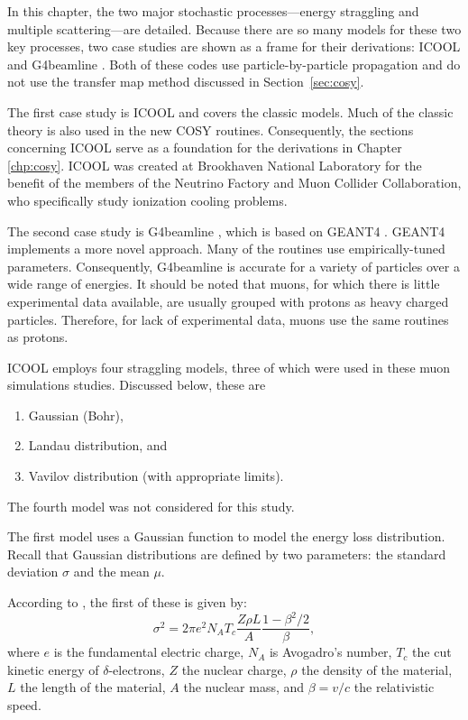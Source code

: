 In this chapter, the two major stochastic processes---energy straggling and multiple scattering---are detailed. Because there are so many models for these two key processes, two case studies are shown as a frame for their derivations: ICOOL \cite{icool} and G4beamline \cite{g4bl}. Both of these codes use particle-by-particle propagation and do not use the transfer map method discussed in Section~\ref{sec:cosy}.

The first case study is ICOOL \cite{icool} and covers the classic models. Much of the classic theory is also used in the new COSY routines. Consequently, the sections concerning ICOOL serve as a foundation for the derivations in Chapter \ref{chp:cosy}. ICOOL was created at Brookhaven National Laboratory for the benefit of the members of the Neutrino Factory and Muon Collider Collaboration, who specifically study ionization cooling problems.

The second case study is G4beamline \cite{g4bl}, which is based on GEANT4 \cite{geant4}. GEANT4 implements a more novel approach. Many of the routines use empirically-tuned parameters. Consequently, G4beamline is accurate for a variety of particles over a wide range of energies. It should be noted that muons, for which there is little experimental data available, are usually grouped with protons as heavy charged particles. Therefore, for lack of experimental data, muons use the same routines as protons.

 \label{sec:ICOOLStraggling}\par
ICOOL \cite{icool} employs four straggling models, three of which were used in these muon simulations studies. Discussed below, these are
\begin{enumerate}
\item{Gaussian (Bohr)},
\item{Landau distribution}, and
\item{Vavilov distribution (with appropriate limits)}.
\end{enumerate}
The fourth model was not considered for this study.

\label{ssc:ICOOLStragglingGaussian} The first model uses a Gaussian function to model the energy loss distribution. Recall that Gaussian distributions are defined by two parameters: the standard deviation $\sigma$ and the mean $\mu$. 

According to \cite{geant4}, the first of these is given by:
\begin{equation}\label{eqn:bohrvariance}
\sigma^2=2\pi e^2 N_A T_c \frac{Z\rho L}{A} \frac{1-\beta^2/2}{\beta},
\end{equation}
where $e$ is the fundamental electric charge, $N_A$ is Avogadro's number, $T_c$ the cut kinetic energy of $\delta$-electrons, $Z$ the nuclear charge, $\rho$ the density of the material, $L$ the length of the material, $A$ the nuclear mass, and $\beta=v/c$ the relativistic speed.


